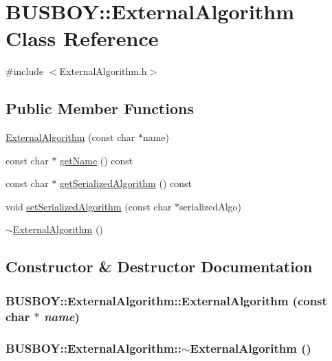 \hypertarget{classBUSBOY_1_1ExternalAlgorithm}{
\section{BUSBOY::ExternalAlgorithm Class Reference}
\label{classBUSBOY_1_1ExternalAlgorithm}
}


{\ttfamily \#include $<$ExternalAlgorithm.h$>$}\subsection*{Public Member Functions}
\begin{DoxyCompactItemize}
\item 
\hyperlink{classBUSBOY_1_1ExternalAlgorithm_ac160f0282f81a68c2afabfc9ef50217c}{ExternalAlgorithm} (const char $\ast$name)
\item 
const char $\ast$ \hyperlink{classBUSBOY_1_1ExternalAlgorithm_afe228b27f0724f5cba056d0eaad726ac}{getName} () const 
\item 
const char $\ast$ \hyperlink{classBUSBOY_1_1ExternalAlgorithm_a0b2e2e8a8b94c2fd8a6bfb899b66c3b6}{getSerializedAlgorithm} () const 
\item 
void \hyperlink{classBUSBOY_1_1ExternalAlgorithm_a1a9df706c19bffdaea5b41b95e2ea06a}{setSerializedAlgorithm} (const char $\ast$serializedAlgo)
\item 
\hyperlink{classBUSBOY_1_1ExternalAlgorithm_a66372a54f505b116c98f7f0fdf210980}{$\sim$ExternalAlgorithm} ()
\end{DoxyCompactItemize}


\subsection{Constructor \& Destructor Documentation}
\hypertarget{classBUSBOY_1_1ExternalAlgorithm_ac160f0282f81a68c2afabfc9ef50217c}{
\subsubsection[{ExternalAlgorithm}]{\setlength{\rightskip}{0pt plus 5cm}BUSBOY::ExternalAlgorithm::ExternalAlgorithm (const char $\ast$ {\em name})}}
\label{classBUSBOY_1_1ExternalAlgorithm_ac160f0282f81a68c2afabfc9ef50217c}
\hypertarget{classBUSBOY_1_1ExternalAlgorithm_a66372a54f505b116c98f7f0fdf210980}{
\subsubsection[{$\sim$ExternalAlgorithm}]{\setlength{\rightskip}{0pt plus 5cm}BUSBOY::ExternalAlgorithm::$\sim$ExternalAlgorithm ()}}
\label{classBUSBOY_1_1ExternalAlgorithm_a66372a54f505b116c98f7f0fdf210980}


